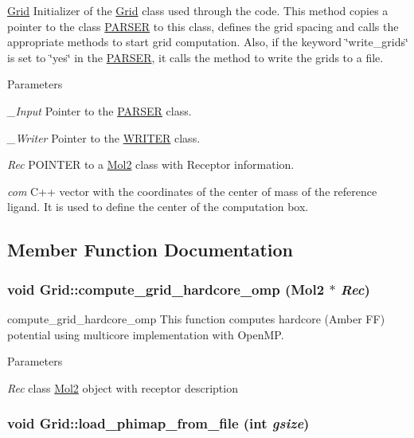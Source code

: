 \hyperlink{classGrid}{Grid} Initializer of the \hyperlink{classGrid}{Grid} class used through the code. This method copies a pointer to the class \hyperlink{classPARSER}{PARSER} to this class, defines the grid spacing and calls the appropriate methods to start grid computation. Also, if the keyword \char`\"{}write\_\-grids\char`\"{} is set to \char`\"{}yes\char`\"{} in the \hyperlink{classPARSER}{PARSER}, it calls the method to write the grids to a file. 
\begin{DoxyParams}{Parameters}
\item[{\em \_\-Input}]Pointer to the \hyperlink{classPARSER}{PARSER} class. \item[{\em \_\-Writer}]Pointer to the \hyperlink{classWRITER}{WRITER} class. \item[{\em Rec}]POINTER to a \hyperlink{classMol2}{Mol2} class with Receptor information. \item[{\em com}]C++ vector with the coordinates of the center of mass of the reference ligand. It is used to define the center of the computation box. \end{DoxyParams}


\subsection{Member Function Documentation}
\hypertarget{classGrid_a3e0a095c71b771e043ff265769cca7c8}{
\subsubsection[{compute\_\-grid\_\-hardcore\_\-omp}]{\setlength{\rightskip}{0pt plus 5cm}void Grid::compute\_\-grid\_\-hardcore\_\-omp ({\bf Mol2} $\ast$ {\em Rec})}}
\label{classGrid_a3e0a095c71b771e043ff265769cca7c8}


compute\_\-grid\_\-hardcore\_\-omp This function computes hardcore (Amber FF) potential using multicore implementation with OpenMP. 
\begin{DoxyParams}{Parameters}
\item[{\em Rec}]class \hyperlink{classMol2}{Mol2} object with receptor description \end{DoxyParams}
\hypertarget{classGrid_a225400892c1206c62a7fc8c8caf8b287}{
\subsubsection[{load\_\-phimap\_\-from\_\-file}]{\setlength{\rightskip}{0pt plus 5cm}void Grid::load\_\-phimap\_\-from\_\-file (int {\em gsize})}}
\label{classGrid_a225400892c1206c62a7fc8c8caf8b287}


